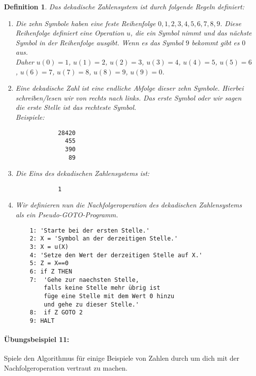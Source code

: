 \documentclass[11pt,a4paper,leqno]{report}
\newtheorem{definition}[theorem]{Definition}
\numberwithin{equation}{chapter}
\begin{document}
\begin{definition}
	Das dekadische Zahlensystem ist durch folgende Regeln definiert:
	\begin{enumerate}
		\item Die zehn Symbole haben eine feste Reihenfolge $0, 1, 2, 3, 4, 5, 6, 7, 8, 9$. Diese Reihenfolge definiert eine Operation $u$, die ein Symbol nimmt und das nächste Symbol in der Reihenfolge ausgibt. Wenn es das Symbol $9$ bekommt gibt es $0$ aus.\\ Daher $u(0)=1$, $u(1)=2$, $u(2)=3$, $u(3)=4$, $u(4)=5$, $u(5)=6$, $u(6)=7$, $u(7)=8$, $u(8)=9$, $u(9)=0$.
		\item Eine dekadische Zahl ist eine endliche Abfolge dieser zehn Symbole. Hierbei schreiben/lesen wir von rechts nach links. Das erste Symbol oder wir sagen die erste Stelle ist das rechteste Symbol. \\Beispiele:
		\begin{lstlisting}
			28420
			  455
			  390
			   89
		\end{lstlisting}
		\item Die Eins des dekadischen Zahlensystems ist:
		\begin{lstlisting}
			1
		\end{lstlisting}
		\item Wir definieren nun die Nachfolgeroperation des dekadischen Zahlensystems als ein Pseudo-GOTO-Programm. \\
\begin{lstlisting}
	1: 'Starte bei der ersten Stelle.'
	2: X = 'Symbol an der derzeitigen Stelle.'
	3: X = u(X)
	4: 'Setze den Wert der derzeitigen Stelle auf X.'
	5: Z = X==0
	6: if Z THEN
	7: 	'Gehe zur naechsten Stelle, 
		falls keine Stelle mehr übrig ist 
		füge eine Stelle mit dem Wert 0 hinzu
		und gehe zu dieser Stelle.'
	8:	if Z GOTO 2
	9: HALT
\end{lstlisting}
	\end{enumerate}
\end{definition}
\paragraph{Übungsbeispiel 11:} Spiele den Algorithmus für einige Beispiele von Zahlen durch um dich mit der Nachfolgeroperation vertraut zu machen.
\end{document}
